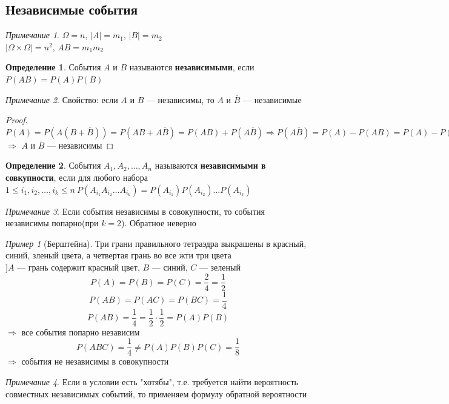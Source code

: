 \documentclass[oneside]{book}
\theoremstyle{plain}
\theoremstyle{remark}
\newtheorem*{remark}{Примечание}
\newtheorem*{examp}{Пример}
\theoremstyle{definition}
\newtheorem*{definition}{Определение}
\begin{document}
\subsection{Независимые события}
\label{sec:org7ff9713}
\begin{remark}
\(\Omega = n\), \(|A| = m_1\), \(|B| = m_2\) \\
\(|\Omega \times \Omega| = n^2\), \(AB = m_1m_2\)
\end{remark}
\begin{definition}
События \(A\) и \(B\) называются \textbf{независимыми}, если \(P(AB) = P(A)P(B)\)
\end{definition}
\begin{remark}
Свойство: если \(A\) и \(B\) --- независимы, то \(A\) и \(\overline{B}\) --- независимые
\end{remark}
\begin{proof}
\(P(A) = P(A(B + \overline{B})) = P(AB + A\overline{B}) = P(AB) + P(A\overline{B}) \Rightarrow P(A\overline{B}) = P(A) - P(AB) = P(A) - P(A)\cdot P(B) = P(A)\cdot(1 - P(B)) = P(A)\cdot P(\overline{B})\) \(\Rightarrow\) \(A\) и \(\overline{B}\) --- независимы
\end{proof}
\begin{definition}
События \(A_1,A_2, \dots, A_n\) называются \textbf{независимыми в совкупности}, если для любого набора \(1 \le i_1, i_2, \dots, i_k \le n\ P(A_{i_1}A_{i_2}\dots A_{i_k}) = P(A_{i_1})P(A_{i_2})\dots P(A_{i_k})\)
\end{definition}
\begin{remark}
Если события независимы в совокупности, то события независимы попарно(при \(k = 2\)). Обратное неверно
\end{remark}
\begin{examp}[Берштейна]
Три грани правильного тетраэдра выкрашены в красный, синий, зленый цвета, а четвертая грань во все жти три цвета \\
\(] A\) --- грань содержит красный цвет, \(B\) --- синий, \(C\) --- зеленый \\
\[ P(A) = P(B) = P(C) = \frac{2}{4} = \frac{1}{2} \]
\[ P(AB) = P(AC) = P(BC) = \frac{1}{4} \]
\[ P(AB) = \frac{1}{4} = \frac{1}{2}\cdot\frac{1}{2} = P(A)P(B) \] \(\Rightarrow\) все события попарно независим
\[ P(ABC) = \frac{1}{4} \neq P(A)P(B)P(C) = \frac{1}{8} \] \(\Rightarrow\) события не независимы в совокупности
\end{examp}
\begin{remark}
Если в условии есть "хотябы", т.е. требуется найти вероятность совместных независимых событий, то применяем формулу обратной вероятности
\end{remark}
\end{document}
